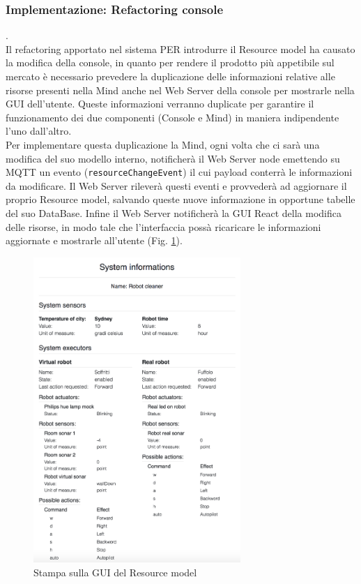 \documentclass{llncs}
\begin{document}
\subsubsection{Implementazione: Refactoring console}.
\label{ImplementazioneRefConsoleReq4}
\vspace*{1ex}
\\
Il refactoring apportato nel sistema PER introdurre il Resource model ha causato la modifica della console, in quanto per rendere il prodotto pi\`u appetibile sul mercato \`e necessario prevedere la duplicazione delle informazioni relative alle risorse presenti nella Mind anche nel Web Server della console per mostrarle nella GUI dell'utente. Queste informazioni verranno duplicate per garantire il funzionamento dei due componenti (Console e Mind) in maniera indipendente l'uno dall'altro.\\
Per implementare questa duplicazione la Mind, ogni volta che ci sar\`a una modifica del suo modello interno, notificher\`a il Web Server node emettendo su MQTT un evento (\texttt{resourceChangeEvent}) il cui payload conterr\`a le informazioni da modificare. Il Web Server rilever\`a questi eventi e provveder\`a ad aggiornare il proprio Resource model, salvando queste nuove informazione in opportune tabelle del suo DataBase. Infine il Web Server notificher\`a la GUI React della modifica delle risorse, in modo tale che l'interfaccia poss\`a ricaricare le informazioni aggiornate e mostrarle all'utente (Fig. \hyperref[fig:RMGUI]{\ref{fig:RMGUI}}).
\begin{figure}
    \centering
    \includegraphics[width=0.7\textwidth]{Immagini/Requisito4/ResourceModelGui.png}
    \caption{Stampa sulla GUI del Resource model}
    \label{fig:RMGUI}
\end{figure}
\end{document}
